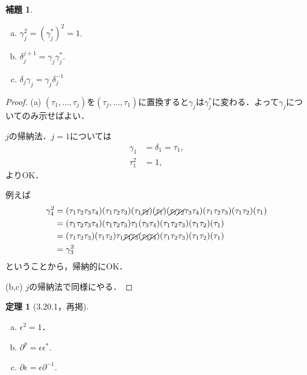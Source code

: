 \documentclass[xelatex,ja=standard,a4paper,14pt,everyparhook=compat]{bxjsarticle}
\theoremstyle{definition}
\newtheorem*{theorem}{定理}
\newtheorem*{lemma}{補題}
\begin{document}
\begin{lemma}
    \begin{enumerate}[(a)]
        \item $\gamma_j^2 = (\gamma_j^*)^2 = 1$.
        \item $\delta_j^{j+1} = \gamma_j \gamma_j^*$.
        \item $\delta_j \gamma_j = \gamma_j \delta_j^{-1}$
    \end{enumerate}
\end{lemma}
\begin{proof}
    (a) $(\tau_1,\ldots,\tau_j)$を$(\tau_j,\ldots,\tau_1)$に置換すると$\gamma_j$は$\gamma_j^*$に変わる．よって$\gamma_j$についてのみ示せばよい．

    $j$の帰納法．$j=1$については \begin{align*}
        \gamma_1 &= \delta_1 = \tau_1, \\
        \tau_1^2 &= 1,
    \end{align*}
    よりOK．

    例えば \begin{align*}
        \gamma_4^2 &= (\tau_1 \tau_2 \tau_3 \tau_4) (\tau_1 \tau_2 \tau_3) (\tau_1 \cancel{\tau_2}) (\cancel{\tau_1}) (\cancel{\tau_1} \cancel{\tau_2} \tau_3 \tau_4) (\tau_1 \tau_2 \tau_3) (\tau_1 \tau_2) (\tau_1) \\
        &= (\tau_1 \tau_2 \tau_3 \tau_4) (\tau_1 \tau_2 \tau_3) \tau_1 (\tau_3 \tau_4) (\tau_1 \tau_2 \tau_3) (\tau_1 \tau_2) (\tau_1) \\
        &= (\tau_1 \tau_2 \tau_3) (\tau_1 \tau_2) \tau_1 \cancel{\tau_4} \cancel{\tau_3} (\cancel{\tau_3} \cancel{\tau_4}) (\tau_1 \tau_2 \tau_3) (\tau_1 \tau_2) (\tau_1) \\
        &= \gamma_3^2
    \end{align*}
    ということから，帰納的にOK．

    (b,c) $j$の帰納法で同様にやる．
\end{proof}

\begin{theorem}[3.20.1，再掲]
    \begin{enumerate}[(a)]
        \item $\epsilon^2 = 1$．
        \item $\partial^p = \epsilon\epsilon^*$.
        \item $\partial\epsilon = \epsilon\partial^{-1}$.
    \end{enumerate}
\end{theorem}
\end{document}
